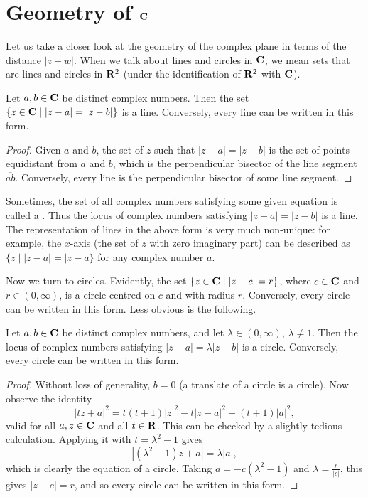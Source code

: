\section{Geometry of $\mathbf C$}
Let us take a closer look at the geometry of the complex plane in terms of the distance $|z-w|$. When we talk about lines and circles in $\mathbf C$, we mean sets that are lines and circles in $\mathbf R^2$ (under the identification of $\mathbf R^2$ with $\mathbf C$).

\begin{lemma}[Lines]
Let $a,b\in\mathbf C$ be distinct complex numbers. Then the set $\{z\in\mathbf C\mid|z-a|=|z-b|\}$ is a line. Conversely, every line can be written in this form.
\end{lemma}

\begin{proof}
Given $a$ and $b$, the set of $z$ such that $|z-a|=|z-b|$ is the set of points equidistant from $a$ and $b$, which is the perpendicular bisector of the line segment $\overline{ab}$. Conversely, every line is the perpendicular bisector of some line segment.
\end{proof}

\begin{remark}
Sometimes, the set of all complex numbers satisfying some given equation is called a . Thus the locus of complex numbers satisfying $|z-a|=|z-b|$ is a line. The representation of lines in the above form is very much non-unique: for example, the $x$-axis (the set of $z$ with zero imaginary part) can be described as $\{z\mid|z-a|=|z-\bar{a}\}$ for any complex number $a$.
\end{remark}

Now we turn to circles. Evidently, the set $\{z\in\mathbf C\mid|z-c|=r\}$, where $c\in\mathbf C$ and $r\in(0,\infty)$, is a circle centred on $c$ and with radius $r$. Conversely, every circle can be written in this form. Less obvious is the following.

\begin{lemma}[Circles]
Let $a,b\in\mathbf C$ be distinct complex numbers, and let $\lambda\in(0,\infty)$, $\lambda\neq1$. Then the locus of complex numbers satisfying $|z-a|=\lambda|z-b|$ is a circle. Conversely, every circle can be written in this form.
\end{lemma}

\begin{proof}
Without loss of generality, $b=0$ (a translate of a circle is a circle). Now observe the identity
\[|tz+a|^2=t(t+1)|z|^2-t|z-a|^2+(t+1)|a|^2,\]
valid for all $a,z\in\mathbf C$ and all $t\in\mathbf R$. This can be checked by a slightly tedious calculation. Applying it with $t=\lambda^2-1$ gives
\[|(\lambda^2-1)z+a|=\lambda|a|,\]
which is clearly the equation of a circle. Taking $a=-c(\lambda^2-1)$ and $\lambda=\frac{r}{|c|}$, this gives $|z-c|=r$, and so every circle can be written in this form.
\end{proof}

